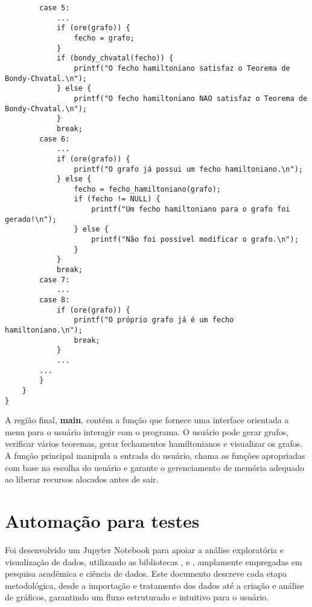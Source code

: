 \documentclass[12pt, openright, oneside, a4paper, chapter=TITLE, section=TITLE, subsection=TITLE, subsubsection=TITLE, brazil]{abntex2}
\newenvironment{codebox}%
  {\begin{mdframed}[backgroundcolor=gray!5, linecolor=gray, roundcorner=5pt]}%
  {\end{mdframed}}
\begin{document}
\begin{codebox}
\begin{verbatim}
        case 5:
            ...
            if (ore(grafo)) {
                fecho = grafo;
            }
            if (bondy_chvatal(fecho)) {
                printf("O fecho hamiltoniano satisfaz o Teorema de Bondy-Chvatal.\n");
            } else {
                printf("O fecho hamiltoniano NAO satisfaz o Teorema de Bondy-Chvatal.\n");
            }
            break;
        case 6:
            ...
            if (ore(grafo)) {
                printf("O grafo já possui um fecho hamiltoniano.\n");
            } else {
                fecho = fecho_hamiltoniano(grafo);
                if (fecho != NULL) {
                    printf("Um fecho hamiltoniano para o grafo foi gerado!\n");
                } else {
                    printf("Não foi possível modificar o grafo.\n");
                }
            }
            break;
        case 7:
            ...
        case 8:
            if (ore(grafo)) {
                printf("O próprio grafo já é um fecho hamiltoniano.\n");
                break;
            }
            ...
        ...
        }
    }
}
\end{verbatim}
\end{codebox}
\hspace{1.25cm}A região final, \textbf{main}, contém a função  que fornece uma interface orientada a menu para o usuário interagir com o programa. O usuário pode gerar grafos, verificar vários teoremas, gerar fechamentos hamiltonianos e visualizar os grafos. A função principal manipula a entrada do usuário, chama as funções apropriadas com base na escolha do usuário e garante o gerenciamento de memória adequado ao liberar recursos alocados antes de sair.

\section{Automação para testes}
\hspace{1.25cm}Foi desenvolvido um Jupyter Notebook para apoiar a análise exploratória e visualização de dados, utilizando as bibliotecas ,  e , amplamente empregadas em pesquisa acadêmica e ciência de dados. Este documento descreve cada etapa metodológica, desde a importação e tratamento dos dados até a criação e análise de gráficos, garantindo um fluxo estruturado e intuitivo para o usuário.
\end{document}
